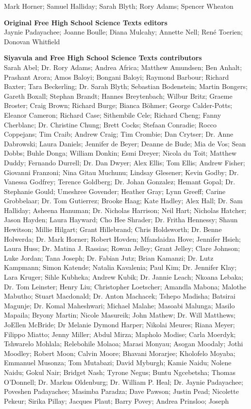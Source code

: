 Mark Horner; Samuel Halliday; Sarah Blyth; Rory Adams; Spencer Wheaton \par 


\textbf{\LARGE Original Free High School Science Texts editors}\\

Jaynie Padayachee; Joanne Boulle; Diana Mulcahy; Annette Nell; René Toerien; Donovan Whitfield \par

\textbf{\LARGE Siyavula and Free High School Science Texts contributors}\\

Sarah Abel; Dr. Rory Adams; Andrea Africa; Matthew Amundsen; Ben Anhalt; Prashant Arora; Amos Baloyi; Bongani Baloyi; Raymond Barbour; Richard Baxter; Tara Beckerling; Dr. Sarah Blyth; Sebastian Bodenstein; Martin Bongers; Gareth Boxall; Stephan Brandt; Hannes Breytenbach; Wilbur Britz; Graeme Broster; Craig Brown; Richard Burge; Bianca Böhmer; George Calder-Potts; Eleanor Cameron; Richard Case; Sithembile Cele; Richard Cheng; Fanny Cherblanc; Dr. Christine Chung; Brett Cocks; Stefaan Conradie; Rocco Coppejans; Tim Craib; Andrew Craig; Tim Crombie; Dan Crytser; Dr. Anne Dabrowski; Laura Daniels; Jennifer de Beyer; Deanne de Bude; Mia de Vos; Sean Dobbs; Buhle Donga; William Donkin; Esmi Dreyer; Nicola du Toit; Matthew Duddy; Fernando Durrell; Dr. Dan Dwyer; Alex Ellis; Tom Ellis; Andrew Fisher; Giovanni Franzoni; Nina Gitau Muchunu; Lindsay Glesener; Kevin Godby; Dr. Vanessa Godfrey; Terence Goldberg; Dr. Johan Gonzalez; Hemant Gopal; Dr. Stephanie Gould; Umeshree Govender; Heather Gray; Lynn Greeff; Carine Grobbelaar; Dr. Tom Gutierrez; Brooke Haag; Kate Hadley; Alex Hall; Dr. Sam Halliday; Asheena Hanuman; Dr. Nicholas Harrison; Neil Hart; Nicholas Hatcher; Jason Hayden; Laura Hayward; Cho Hee Shrader; Dr. Fritha Hennessy; Shaun Hewitson; Millie Hilgart; Grant Hillebrand; Chris Holdsworth; Dr. Benne Holwerda; Dr. Mark Horner; Robert Hovden; Mfandaidza Hove; Jennifer Hsieh; Laura Huss; Dr. Matina J. Rassias; Rowan Jelley; Grant Jelley; Clare Johnson; Luke Jordan; Tana Joseph; Dr. Fabian Jutz; Brian Kamanzi; Dr. Lutz Kampmann; Simon Katende; Natalia Kavalenia; Paul Kim; Dr. Jennifer Klay; Lara Kruger; Sihle Kubheka; Andrew Kubik; Dr. Jannie Leach; Nkoana Lebaka; Dr. Tom Leinster; Henry Liu; Christopher Loetscher; Amandla Mabona; Malothe Mabutho; Stuart Macdonald; Dr. Anton Machacek; Tshepo Madisha; Batsirai Magunje; Dr. Komal Maheshwari; Michael Malahe; Masoabi Malunga; Masilo Mapaila; Bryony Martin; Nicole Masureik; John Mathew; Dr. Will Matthews; JoEllen McBride; Dr Melanie Dymond Harper; Nikolai Meures; Riana Meyer; Filippo Miatto; Jenny Miller; Abdul Mirza; Mapholo Modise; Carla Moerdyk; Tshwarelo Mohlala; Relebohile Molaoa; Marasi Monyau; Asogan Moodaly; Jothi Moodley; Robert Moon; Calvin Moore; Bhavani Morarjee; Kholofelo Moyaba; Emmanuel Musonza; Tom Mutabazi; David Myburgh; Kamie Naidu; Nolene Naidu; Gokul Nair; Bridget Nash; Tyrone Negus; Buntu Ngcebetsha; Thomas O’Donnell; Dr. Markus Oldenburg; Dr. William P. Heal; Dr. Jaynie Padayachee; Poveshen Padayachee; Masimba Paradza; Dave Pawson; Justin Pead; Nicolette Pekeur; Sirika Pillay; Jacques Plaut; Barry Povey; Andrea Prinsloo; Joseph 